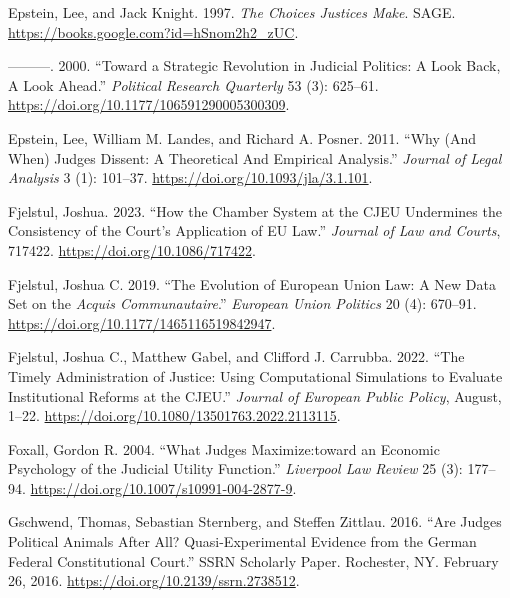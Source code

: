 \documentclass[
  11pt,
]{article}
\newlength{\cslhangindent}
\newenvironment{CSLReferences}[2] %
 {%
  \setlength{\parindent}{0pt}
  \ifodd #1 \everypar{\setlength{\hangindent}{\cslhangindent}}\ignorespaces\fi
  \ifnum #2 > 0
  \setlength{\parskip}{#2\baselineskip}
  \fi
 }%
 {}
\begin{document}
\begin{CSLReferences}{1}{0}
\leavevmode{}%
Epstein, Lee, and Jack Knight. 1997. \emph{The {Choices Justices Make}}.
{SAGE}. \url{https://books.google.com?id=hSnom2h2_zUC}.

\leavevmode{}%
---------. 2000. {``Toward a {Strategic Revolution} in {Judicial
Politics}: {A Look Back}, {A Look Ahead}.''} \emph{Political Research
Quarterly} 53 (3): 625--61.
\url{https://doi.org/10.1177/106591290005300309}.

\leavevmode{}%
Epstein, Lee, William M. Landes, and Richard A. Posner. 2011. {``Why
({And When}) {Judges Dissent}: {A Theoretical And Empirical
Analysis}.''} \emph{Journal of Legal Analysis} 3 (1): 101--37.
\url{https://doi.org/10.1093/jla/3.1.101}.

\leavevmode{}%
Fjelstul, Joshua. 2023. {``How the {Chamber System} at the {CJEU
Undermines} the {Consistency} of the {Court}'s {Application} of {EU
Law}.''} \emph{Journal of Law and Courts}, 717422.
\url{https://doi.org/10.1086/717422}.

\leavevmode{}%
Fjelstul, Joshua C. 2019. {``The Evolution of {European Union} Law: {A}
New Data Set on the {\emph{Acquis Communautaire}}.''} \emph{European
Union Politics} 20 (4): 670--91.
\url{https://doi.org/10.1177/1465116519842947}.

\leavevmode{}%
Fjelstul, Joshua C., Matthew Gabel, and Clifford J. Carrubba. 2022.
{``The Timely Administration of Justice: Using Computational Simulations
to Evaluate Institutional Reforms at the {CJEU}.''} \emph{Journal of
European Public Policy}, August, 1--22.
\url{https://doi.org/10.1080/13501763.2022.2113115}.

\leavevmode{}%
Foxall, Gordon R. 2004. {``What Judges Maximize:toward an Economic
Psychology of the Judicial Utility Function.''} \emph{Liverpool Law
Review} 25 (3): 177--94.
\url{https://doi.org/10.1007/s10991-004-2877-9}.

\leavevmode{}%
Gschwend, Thomas, Sebastian Sternberg, and Steffen Zittlau. 2016. {``Are
{Judges Political Animals} After {All}? {Quasi-Experimental Evidence}
from the {German Federal Constitutional Court}.''} SSRN Scholarly Paper.
{Rochester, NY}. February 26, 2016.
\url{https://doi.org/10.2139/ssrn.2738512}.


\end{CSLReferences}
\end{document}

